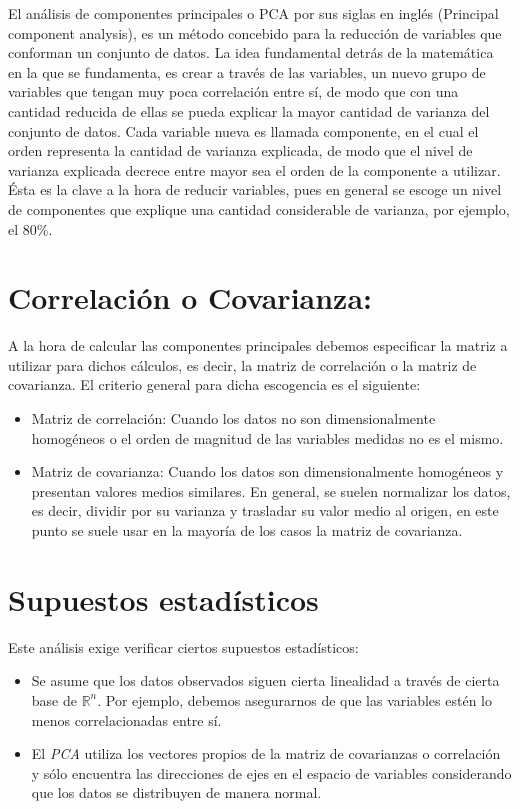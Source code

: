 \documentclass[12pt,]{krantz}
\begin{document}
El análisis de componentes principales o PCA por sus siglas en inglés (Principal component analysis), es un método concebido para la reducción de variables que conforman un conjunto de datos. La idea fundamental detrás de la matemática en la que se fundamenta, es crear a través de las variables, un nuevo grupo de variables que tengan muy poca correlación entre sí, de modo que con una cantidad reducida de ellas se pueda explicar la mayor cantidad de varianza del conjunto de datos. Cada variable nueva es llamada componente, en el cual el orden representa la cantidad de varianza explicada, de modo que el nivel de varianza explicada decrece entre mayor sea el orden de la componente a utilizar. Ésta es la clave a la hora de reducir variables, pues en general se escoge un nivel de componentes que explique una cantidad considerable de varianza, por ejemplo, el 80\%.

\hypertarget{correlacion-o-covarianza}{%
\section{Correlación o Covarianza:}\label{correlacion-o-covarianza}}

A la hora de calcular las componentes principales debemos especificar la matriz a utilizar para dichos cálculos, es decir, la matriz de correlación o la matriz de covarianza. El criterio general para dicha escogencia es el siguiente:

\begin{itemize}
\item
  Matriz de correlación: Cuando los datos no son dimensionalmente homogéneos o el orden de magnitud de las variables medidas no es el mismo.
\item
  Matriz de covarianza: Cuando los datos son dimensionalmente homogéneos y presentan valores medios similares.
  En general, se suelen normalizar los datos, es decir, dividir por su varianza y trasladar su valor medio al origen, en este punto se suele usar en la mayoría de los casos la matriz de covarianza.
\end{itemize}

\hypertarget{supuestos-estadisticos}{%
\section{Supuestos estadísticos}\label{supuestos-estadisticos}}

Este análisis exige verificar ciertos supuestos estadísticos:

\begin{itemize}
\item
  Se asume que los datos observados siguen cierta linealidad a través de cierta base de \(\mathbb{R}^n\). Por ejemplo, debemos asegurarnos de que las variables estén lo menos correlacionadas entre sí.
\item
  El \emph{PCA} utiliza los vectores propios de la matriz de covarianzas o correlación y sólo encuentra las direcciones de ejes en el espacio de variables considerando que los datos se distribuyen de manera normal.
\end{itemize}
\end{document}
